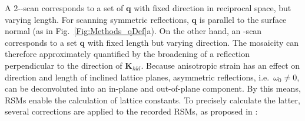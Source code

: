 A 2\texttheta-\textomega-scan corresponds to a set of $\mathbf{q}$ with fixed direction in reciprocal space, but varying length.
For scanning symmetric reflections, $\mathbf{q}$ is parallel to the surface normal (as in Fig.~\ref{Fig:Methods_qDef}a).
On the other hand, an \textomega-scan corresponds to a set $\mathbf{q}$ with fixed length but varying direction.
The mosaicity can therefore approximately quantified by the broadening of a reflection perpendicular to the direction of $\mathbf{K}_{hkl}$.
Because anisotropic strain has an effect on direction and length of inclined lattice planes, asymmetric reflections, i.e.\ $\omega_0\neq0$, can be deconvoluted into an in-plane and out-of-plane component.
By this means, \glspl{RSM} enable the calculation of lattice constants.
To precisely calculate the latter, several corrections are applied to the recorded \glspl{RSM}, as proposed in \textcite{kneiss2021}:
